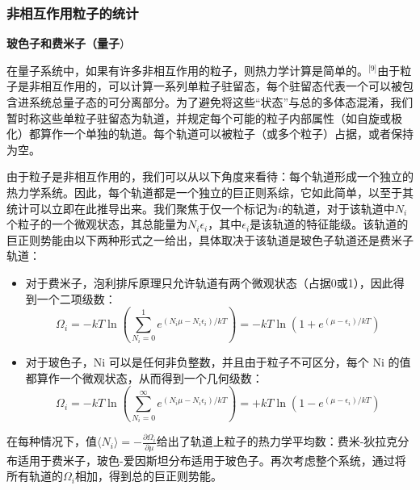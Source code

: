 \subsubsection{非相互作用粒子的统计}

\textbf{玻色子和费米子（量子}）

在量子系统中，如果有许多非相互作用的粒子，则热力学计算是简单的。\(^\text{[9]}\)由于粒子是非相互作用的，可以计算一系列单粒子驻留态，每个驻留态代表一个可以被包含进系统总量子态的可分离部分。为了避免将这些“状态”与总的多体态混淆，我们暂时称这些单粒子驻留态为轨道，并规定每个可能的粒子内部属性（如自旋或极化）都算作一个单独的轨道。每个轨道可以被粒子（或多个粒子）占据，或者保持为空。

由于粒子是非相互作用的，我们可以从以下角度来看待：每个轨道形成一个独立的热力学系统。因此，每个轨道都是一个独立的巨正则系综，它如此简单，以至于其统计可以立即在此推导出来。我们聚焦于仅一个标记为\(i\)的轨道，对于该轨道中\(N_i\)个粒子的一个微观状态，其总能量为\(N_i\epsilon_i\)，其中\(\epsilon_i\)是该轨道的特征能级。该轨道的巨正则势能由以下两种形式之一给出，具体取决于该轨道是玻色子轨道还是费米子轨道：

\begin{itemize}
\item 对于费米子，泡利排斥原理只允许轨道有两个微观状态（占据0或1），因此得到一个二项级数：
\[
\Omega_i = -kT \ln \left( \sum_{N_i=0}^{1} e^{(N_i \mu - N_i \epsilon_i)/kT} \right) = -kT \ln \left( 1 + e^{(\mu - \epsilon_i)/kT} \right)~
\]
\item 对于玻色子，Ni 可以是任何非负整数，并且由于粒子不可区分，每个 Ni 的值都算作一个微观状态，从而得到一个几何级数：
\[
\Omega_i = -kT \ln \left( \sum_{N_i=0}^{\infty} e^{(N_i \mu - N_i \epsilon_i)/kT} \right) = +kT \ln \left( 1 - e^{(\mu - \epsilon_i)/kT} \right)~
\]
\end{itemize}
在每种情况下，值\(\langle N_i \rangle = -\frac{\partial \Omega_i}{\partial \mu}\)给出了轨道上粒子的热力学平均数：费米-狄拉克分布适用于费米子，玻色-爱因斯坦分布适用于玻色子。再次考虑整个系统，通过将所有轨道的\(\Omega_i\)相加，得到总的巨正则势能。